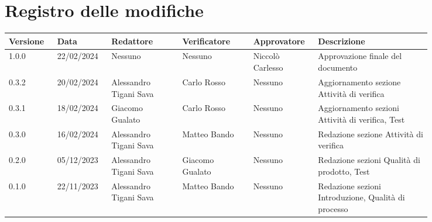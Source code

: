 \section*{Registro delle modifiche}
{
\renewcommand{\arraystretch}{1.5}
\scriptsize
\begin{longtable}{p{0.10\linewidth}p{0.10\linewidth}p{0.15\linewidth}p{0.15\linewidth}p{0.10\linewidth}p{0.24\linewidth}}
	\textbf{Versione} & \textbf{Data} & \textbf{Redattore}	& \textbf{Verificatore} & \textbf{Approvatore} & \textbf{Descrizione}	\\
	\toprule
	1.0.0	& 22/02/2024	& Nessuno					& Nessuno			& Niccolò Carlesso	& Approvazione finale del documento	\\
	\hline
	0.3.2	& 20/02/2024	& Alessandro Tigani Sava	& Carlo Rosso		& Nessuno	& Aggiornamento sezione Attività di verifica	\\
	\hline
	0.3.1	& 18/02/2024	& Giacomo Gualato			& Carlo Rosso		& Nessuno	& Aggiornamento sezioni Attività di verifica, Test	\\
	\hline
	0.3.0	& 16/02/2024	& Alessandro Tigani Sava	& Matteo Bando		& Nessuno	& Redazione sezione Attività di verifica	\\
	\hline
	0.2.0 	& 05/12/2023	& Alessandro Tigani Sava 	& Giacomo Gualato	& Nessuno	& Redazione sezioni Qualità di prodotto, Test \\
	\hline
	0.1.0	& 22/11/2023    & Alessandro Tigani Sava	& Matteo Bando		& Nessuno	& Redazione sezioni Introduzione, Qualità di processo	\\
	\bottomrule
\end{longtable}
}